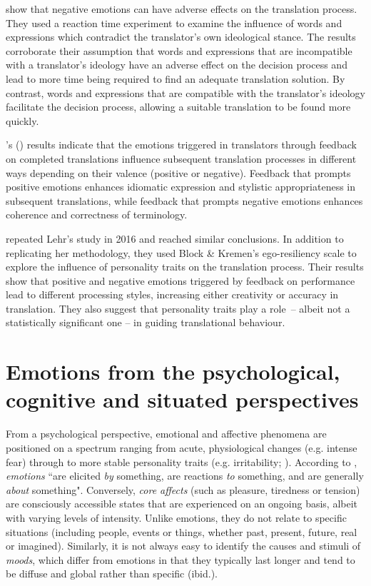 \documentclass[output=paper]{langscibook}
\begin{document}
\citet{RojoLópez2014} show that negative emotions can have adverse effects on the translation process. They used a reaction time experiment to examine the influence of words and expressions which contradict the translator’s own ideological stance. The results corroborate their assumption that words and expressions that are incompatible with a translator’s ideology have an adverse effect on the decision process and lead to more time being required to find an adequate translation solution. By contrast, words and expressions that are compatible with the translator's ideology facilitate the decision process, allowing a suitable translation to be found more quickly.

\citeauthor{Lehr2014}'s (\citeyear{Lehr2014}) results indicate that the emotions triggered in translators through feedback on completed translations influence subsequent translation processes in different ways depending on their valence (positive or negative). Feedback that prompts positive emotions enhances idiomatic expression and stylistic appropriateness in subsequent translations, while feedback that prompts negative emotions enhances coherence and correctness of terminology.

\citeauthor{RojoLópez2016} repeated Lehr’s study in 2016 and reached similar conclusions. In addition to replicating her methodology, they used Block \& Kremen’s ego-resiliency scale to explore the influence of personality traits on the translation process. Their results show that positive and negative emotions triggered by feedback on performance lead to different processing styles, increasing either creativity or accuracy in translation. They also suggest that personality traits play a role~-- albeit not a statistically significant one -- in guiding translational behaviour.

\section{Emotions from the psychological, cognitive and situated perspectives}
From a psychological perspective, emotional and affective phenomena are positioned on a spectrum ranging from acute, physiological changes (e.g. intense fear) through to more stable personality traits (e.g. irritability; \citealt[40]{Davou2007}). According to \citet[322]{Ekkekakis2012}, \textit{emotions} “are elicited \textit{by} something, are reactions \textit{to} something, and are generally \textit{about} something". Conversely, \textit{core affects} (such as pleasure, tiredness or tension) are consciously accessible states that are experienced on an ongoing basis, albeit with varying levels of intensity. Unlike emotions, they do not relate to specific situations (including people, events or things, whether past, present, future, real or imagined). Similarly, it is not always easy to identify the causes and stimuli of \textit{moods}, which differ from emotions in that they typically last longer and tend to be diffuse and global rather than specific (ibid.).
\end{document}
